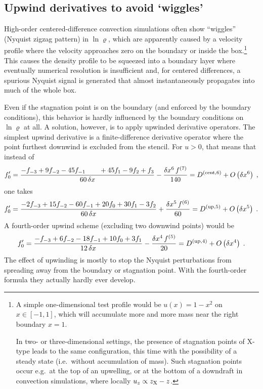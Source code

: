 \documentclass[\mydriver,12pt,twoside,notitlepage,a4paper]{article}
\begin{document}
\subsection{Upwind derivatives to avoid `wiggles'}
\label{S-upwind}
\newcommand{\Order}[1]{O\left(#1\right)}

High-order centered-difference convection simulations often show
``wiggles'' (Nyquist zigzag pattern) in $\ln\varrho$, which are apparently
caused by a velocity profile where the velocity approaches zero on the
boundary or inside the box.\footnote{%
  A simple one-dimensional test profile would be $u(x) = 1-x^2$ on $x \in
  [-1,1]$, which will accumulate more and more mass near the right
  boundary $x=1$.

  In two- or three-dimensional settings, the presence of stagnation points
  of X-type leads to the same configuration, this time with the
  possibility of a steady state (i.e.~without accumulation of mass).
  Such stagnation points occur e.g.~at the top of an upwelling, or at
  the bottom of a downdraft in convection simulations, where locally
  $u_z \propto z_{\rm X}-z$.
}
This causes the density profile to be squeezed into a boundary layer where
eventually numerical resolution is insufficient and, for centered
differences, a spurious Nyquist signal is generated that almost
instantaneously propagates into much of the whole box.

Even if the stagnation point is on the boundary (and enforced by the
boundary conditions), this behavior is hardly influenced by the boundary
conditions on $\ln\varrho$ at all.
A solution, however, is to apply upwinded derivative operators.
The simplest upwind derivative is a finite-difference derivative operator
where the point furthest downwind is excluded from the stencil.
For $u>0$, that means that instead of
\begin{equation}
  f'_0
  = \frac{-f_{-3} + 9 f_{-2} - 45 f_{-1} \qquad
           + 45 f_{1} - 9 f_{2} + f_{3}}
         {60\,\delta x}
    - \frac{\delta x^6\,f^{(7)}}{140}
  = D^{\rm(cent,6)} + \Order{\delta x^6} \; ,
\end{equation}
one takes
\begin{equation}
  f'_0
  = \frac{-2 f_{-3} + 15 f_{-2} - 60 f_{-1} + 20 f_{0} + 30 f_{1} - 3 f_{2}}
         {60\,\delta x}
    + \frac{\delta x^5\,f^{(6)}}{60}
  = D^{\rm(up,5)} + \Order{\delta x^5} \; .
\end{equation}
A fourth-order upwind scheme (excluding two downwind points) would be
\begin{equation}
  f'_0
  = \frac{-f_{-3} + 6 f_{-2} - 18 f_{-1} + 10 f_{0} + 3 f_{1}}
         {12\,\delta x}
    - \frac{\delta x^4\,f^{(5)}}{20}
  = D^{\rm(up,4)} + \Order{\delta x^4} \; .
\end{equation}
The effect of upwinding is mostly to stop the Nyquist perturbations from
spreading away from the boundary or stagnation point.
With the fourth-order formula they actually hardly ever develop.
\end{document}
